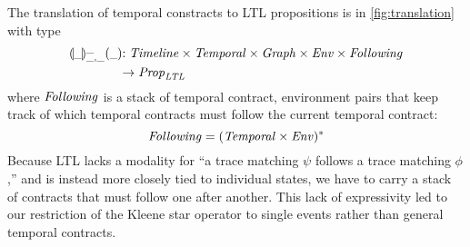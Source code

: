 \documentclass[preprint,onecolumn,9pt]{sigplanconf} %
\begin{document}
The translation of temporal constracts to LTL propositions is in \autoref{fig:translation} with type
\begin{align*}
{\scriptsize \toltl{\_}{\_}{\_}{\_}{\_}} &{\scriptsize : \Timeline \times \TContract \times \Graph \times \Env \times \TConEnvStack}\\ & {\scriptsize \to \LTLProp}
\end{align*}
%
where $\mathit{Following}$ is a stack of temporal contract, environment pairs that keep track of which temporal contracts must follow the current temporal contract:
%
\begin{equation*}
  \mathit{Following} = (\mathit{Temporal} \times \mathit{Env})^*
\end{equation*}
%
Because LTL lacks a modality for ``a trace matching $\psi$ follows a trace matching $\phi$,'' and is instead more closely tied to individual states, we have to carry a stack of contracts that must follow one after another.
%
This lack of expressivity led to our restriction of the Kleene star operator to single events rather than general temporal contracts.
\end{document}

